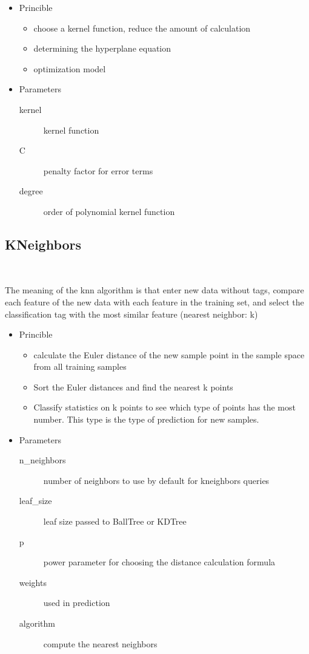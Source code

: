 \begin{itemize}
	\item Princible
	
	\begin{itemize}
		\item choose a kernel function, reduce the amount of calculation
		\item determining the hyperplane equation
		\item optimization model
	\end{itemize}

	\item Parameters
	
	\begin{description}
		\item[kernel] kernel function
		\item[C] penalty factor for error terms
		\item[degree] order of polynomial kernel function
	\end{description}
	
\end{itemize}

\subsection{KNeighbors}
\

The meaning of the knn algorithm is that 
enter new data without tags, 
compare each feature of the new data with 
each feature in the training set, 
and select the classification tag with 
the most similar feature (nearest neighbor: k)

\begin{itemize}
	\item Princible
	\begin{itemize}
		\item calculate the Euler distance of 
		the new sample point in the sample space 
		from all training samples
		\item Sort the Euler distances and 
		find the nearest k points
		\item Classify statistics on k points to 
		see which type of points has 
		the most number. 
		This type is the type of 
		prediction for new samples.
	\end{itemize}
	
	\item Parameters
	\begin{description}
		\item[n_neighbors] number of neighbors to use 
		by default for kneighbors queries
		\item[leaf_size] leaf size passed to BallTree or KDTree
		\item[p] power parameter for choosing 
		the distance calculation formula
		\item[weights] used in prediction
		\item[algorithm] compute the nearest neighbors
	\end{description}
	
\end{itemize}

